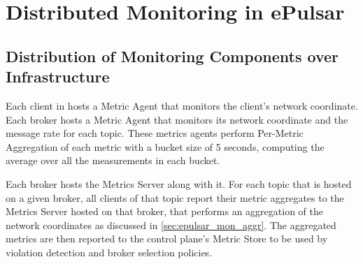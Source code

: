 \section{Distributed Monitoring in ePulsar}
\label{sec:epulsar_dist_mon}
\subsection{Distribution of Monitoring Components over Infrastructure}
Each client in \epulsar{} hosts a Metric Agent that monitors the client's network coordinate. Each broker hosts a Metric Agent that monitors its network coordinate and the message rate for each topic. These metrics agents perform Per-Metric Aggregation of each metric with a bucket size of 5 seconds, computing the average over all the measurements in each bucket. 
\par Each broker hosts the Metrics Server along with it. For each topic that is hosted on a given broker, all clients of that topic report their metric aggregates to the Metrics Server hosted on that broker, that performs an aggregation of the network coordinates as discussed in \cref{sec:epulsar_mon_aggr}. The aggregated metrics are then reported to the control plane's Metric Store to be used by violation detection and broker selection policies.


